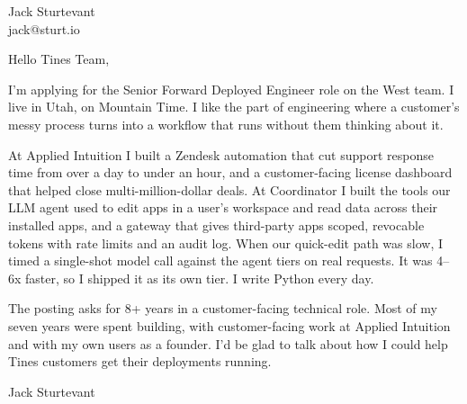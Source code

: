 \documentclass[11pt]{article}
\begin{document}
\raggedright

{\namefont\fontsize{20pt}{24pt}\selectfont Jack Sturtevant}\\[-0.3em]
jack@sturt.io

\vspace{1.2em}

Hello Tines Team,

I'm applying for the Senior Forward Deployed Engineer role on the West team. I live in Utah, on Mountain Time. I like the part of engineering where a customer's messy process turns into a workflow that runs without them thinking about it.

At Applied Intuition I built a Zendesk automation that cut support response time from over a day to under an hour, and a customer-facing license dashboard that helped close multi-million-dollar deals. At Coordinator I built the tools our LLM agent used to edit apps in a user's workspace and read data across their installed apps, and a gateway that gives third-party apps scoped, revocable tokens with rate limits and an audit log. When our quick-edit path was slow, I timed a single-shot model call against the agent tiers on real requests. It was 4--6x faster, so I shipped it as its own tier. I write Python every day.

The posting asks for 8+ years in a customer-facing technical role. Most of my seven years were spent building, with customer-facing work at Applied Intuition and with my own users as a founder. I'd be glad to talk about how I could help Tines customers get their deployments running.

\vspace{0.6em}
Jack Sturtevant
\end{document}
